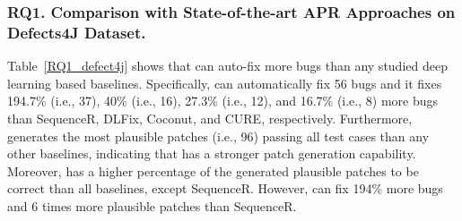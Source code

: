 \subsubsection{\bf RQ1. Comparison with State-of-the-art APR Approaches on Defects4J Dataset.}

Table~\ref{RQ1_defect4j} shows that {\tool} can auto-fix more bugs than any studied deep learning based baselines. Specifically, {\tool} can automatically fix 56 bugs and it fixes 194.7\% (i.e., 37), 40\% (i.e., 16), 27.3\% (i.e., 12), and 16.7\% (i.e., 8) more bugs than SequenceR, DLFix, Coconut, and CURE, respectively. Furthermore, {\tool} generates the most plausible patches (i.e., 96) passing all test cases than any other baselines, indicating that {\tool} has a stronger patch generation capability. %
Moreover, {\tool} has a higher percentage of the generated plausible patches to be correct than all baselines, except SequenceR. However, {\tool} can fix 194\% more bugs and 6 times more plausible patches than SequenceR.






